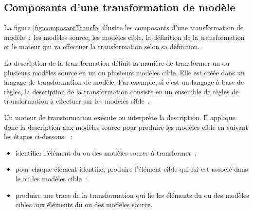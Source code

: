 \subsection{Composants d'une transformation de modèle} 
La figure \ref{fig:composantTransfo} illustre les composants d'une 
transformation de modèle~:~les modèles source, les modèles cible, la définition 
de la transformation et le moteur qui va effectuer la transformation selon sa 
définition. 

La description de la transformation définit la manière de transformer un ou plusieurs modèles source en un ou plusieurs modèles cible. Elle est créée dans 
un langage de transformation de modèle. Par exemple, si c'est un langage à base 
de règles, la description de la transformation consiste en un ensemble de règles 
de transformation à effectuer sur les modèles cible~\cite{kleppe2003mda}. 

Un moteur de transformation exécute ou interprète la description. Il applique 
donc la description aux modèles source pour produire les modèles cible en 
suivant les étapes ci-dessous~\cite{tratt2005model}~:

\begin{itemize}
\item identifier l'élément du ou des modèles source à transformer~;
\item pour chaque élément identifié, produire l'élément cible qui lui est 
associé dans le ou les modèles cible~;
\item produire une trace de la transformation qui lie les éléments du ou des 
modèles cibles aux éléments du ou des modèles source.
\end{itemize}

